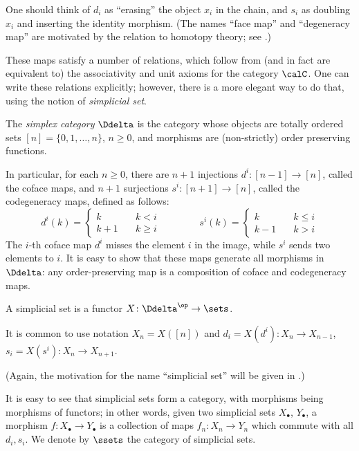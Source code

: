 One should think of $d_i$ as ``erasing'' the object $x_i$ in the chain, and $s_i$
as doubling $x_i$ and inserting the identity morphism. (The names ``face map''
and ``degeneracy map'' are motivated by the relation to homotopy theory; see
.)

These maps satisfy a number of relations, which follow from (and in fact are
equivalent to) the associativity and unit axioms for the category $\calC$. One can write
these relations explicitly; however, there is a more elegant way to do that,
using the notion of \emph{simplicial set}.

\begin{definition}\label{d:simplex-category}
The \emph{simplex category} $\Ddelta$ is the category whose objects are
totally ordered sets $[n] = \{0,1,\dots,n\}$, $n \ge 0$, and morphisms are
(non-strictly) order preserving functions.
\end{definition}
In particular, for each $n\ge 0$, there are $n + 1$ injections
$d^i\colon [n-1] \to [n]$, called the coface maps, and
$n + 1$ surjections $s^i \colon [n + 1] \to [n]$,
called the codegeneracy maps, defined as follows:
$$
d^i(k) = \begin{cases}
            k & \quad k<i\\
            k+1 & \quad k\ge i
          \end{cases}
\qquad \qquad
s^i(k) = \begin{cases}
            k & \quad k\le i\\
            k-1 & \quad k> i
          \end{cases}
$$
The $i$-th coface map $d^i$ misses the element $i$ in the image, while $s^i$
sends two elements to $i$. It is easy to show that these maps generate all
morphisms in $\Ddelta$: any order-preserving map is a composition of coface and
codegeneracy maps.

\begin{definition}\label{d:simplicial-set}
  A simplicial set is a functor $X\colon \Ddelta^\op\to \sets$.
\end{definition}
It is common to use notation $X_n=X([n])$ and $d_i=X(d^i)\colon X_{n}\to
X_{n-1}$, $s_i = X(s^i)\colon X_n\to X_{n+1}$.

(Again, the motivation for the name ``simplicial set'' will be given in
.)

It is easy to see that simplicial sets form a category, with morphisms being
morphisms of functors; in other words, given two simplicial sets $X_\bullet$,
$Y_\bullet$, a morphism $f\colon X_\bullet \to Y_\bullet$ is a collection of
maps $f_n\colon X_n\to Y_n$ which commute with all $d_i, s_i$. We denote by
$\ssets$ the category of simplicial sets.

